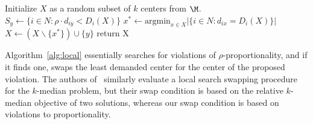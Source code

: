 

\begin{algorithm}
\begin{algorithmic}[1]
\caption{Local Capture}
\label{alg:local}
	\STATE Initialize $X$ as a random subset of $k$ centers from $\M$.
	\REPEAT
		\STATE $S_y \gets \{i \in N: \rho \cdot d_{iy} < D_i(X)\}$
			\STATE $x^* \gets \mbox{argmin}_{x \in X} | \{i \in N: d_{ix} = D_i(X) \}|$
			\STATE $X \gets (X \backslash \{x^*\}) \cup \{y\}$
		\ENDIF
	\ENDFOR
	\STATE return X
\end{algorithmic}
\end{algorithm}

Algorithm~\ref{alg:local} essentially searches for violations of $\rho$-proportionality, and if it finds one, swaps the least demanded center for the center of the proposed violation. The authors of~\cite{kMedians} similarly evaluate a local search swapping procedure for the $k$-median problem, but their swap condition is based on the relative $k$-median objective of two solutions, whereas our swap condition is based on violations to proportionality. 


